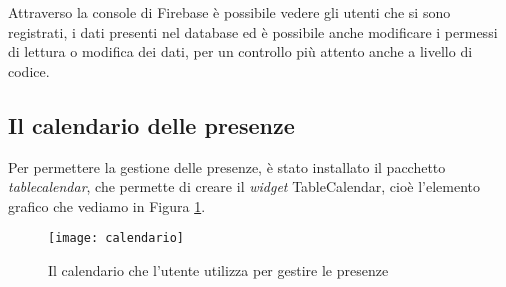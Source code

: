 Attraverso la console di Firebase è possibile vedere gli utenti che si sono registrati, i dati presenti nel database ed è possibile anche modificare i permessi di lettura o modifica dei dati, per un controllo più attento anche a livello di codice. 

\newpage

\subsection{Il calendario delle presenze}
Per permettere la gestione delle presenze, è stato installato il pacchetto \emph{table\textunderscore calendar}, che permette di creare il \emph{widget} TableCalendar, cioè l'elemento grafico che vediamo in Figura \ref{fig:calendario}.
\begin{figure}[!h] 
    \centering 
    \texttt{[image: calendario]} 
    \caption{Il calendario che l'utente utilizza per gestire le presenze}
    \label{fig:calendario}
\end{figure}


